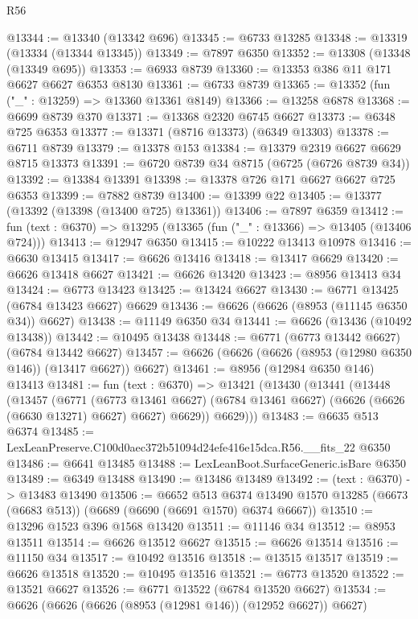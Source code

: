 \begin{lexlean}{R56}
\begin{coremodule}
@13344 := @13340 (@13342 @696)
@13345 := @6733 @13285
@13348 := @13319 (@13334 (@13344 @13345))
@13349 := @7897 @6350
@13352 := @13308 (@13348 (@13349 @695))
@13353 := @6933 @8739
@13360 := @13353 @386 @11 @171 @6627 @6627 @6353 @8130
@13361 := @6733 @8739
@13365 := @13352 (fun ("_" : @13259) => @13360 @13361 @8149)
@13366 := @13258 @6878
@13368 := @6699 @8739 @370
@13371 := @13368 @2320 @6745 @6627
@13373 := @6348 @725 @6353
@13377 := @13371 (@8716 @13373) (@6349 @13303)
@13378 := @6711 @8739
@13379 := @13378 @153
@13384 := @13379 @2319 @6627 @6629 @8715 @13373
@13391 := @6720 @8739 @34 @8715 (@6725 (@6726 @8739 @34))
@13392 := @13384 @13391
@13398 := @13378 @726 @171 @6627 @6627 @725 @6353
@13399 := @7882 @8739
@13400 := @13399 @22
@13405 := @13377 (@13392 (@13398 (@13400 @725) @13361))
@13406 := @7897 @6359
@13412 := fun (text : @6370) => @13295 (@13365 (fun ("_" : @13366) => @13405 (@13406 @724)))
@13413 := @12947 @6350
@13415 := @10222 @13413 @10978
@13416 := @6630 @13415
@13417 := @6626 @13416
@13418 := @13417 @6629
@13420 := @6626 @13418 @6627
@13421 := @6626 @13420
@13423 := @8956 @13413 @34
@13424 := @6773 @13423
@13425 := @13424 @6627
@13430 := @6771 @13425 (@6784 @13423 @6627) @6629
@13436 := @6626 (@6626 (@8953 (@11145 @6350 @34)) @6627)
@13438 := @11149 @6350 @34
@13441 := @6626 (@13436 (@10492 @13438))
@13442 := @10495 @13438
@13448 := @6771 (@6773 @13442 @6627) (@6784 @13442 @6627)
@13457 := @6626 (@6626 (@6626 (@8953 (@12980 @6350 @146)) (@13417 @6627)) @6627)
@13461 := @8956 (@12984 @6350 @146) @13413
@13481 := fun (text : @6370) =>
  @13421
    (@13430
      (@13441
        (@13448
          (@13457
            (@6771
              (@6773 @13461 @6627)
              (@6784 @13461 @6627)
              (@6626 (@6626 (@6630 @13271) @6627) @6627)
              @6629))
          @6629)))
@13483 := @6635 @513 @6374
@13485 := LexLeanPreserve.C100d0aec372b51094d24efe416e15dca.R56.__fits_22 @6350
@13486 := @6641 @13485
@13488 := LexLeanBoot.SurfaceGeneric.isBare @6350
@13489 := @6349 @13488
@13490 := @13486 @13489
@13492 := (text : @6370) -> @13483 @13490
@13506 := @6652
    @513
    @6374
    @13490
    @1570
    @13285
    (@6673 (@6683 @513))
    (@6689 (@6690 (@6691 @1570) @6374 @6667))
@13510 := @13296 @1523 @396 @1568 @13420
@13511 := @11146 @34
@13512 := @8953 @13511
@13514 := @6626 @13512 @6627
@13515 := @6626 @13514
@13516 := @11150 @34
@13517 := @10492 @13516
@13518 := @13515 @13517
@13519 := @6626 @13518
@13520 := @10495 @13516
@13521 := @6773 @13520
@13522 := @13521 @6627
@13526 := @6771 @13522 (@6784 @13520 @6627)
@13534 := @6626 (@6626 (@6626 (@8953 (@12981 @146)) (@12952 @6627)) @6627)

\end{coremodule}
\end{lexlean}
